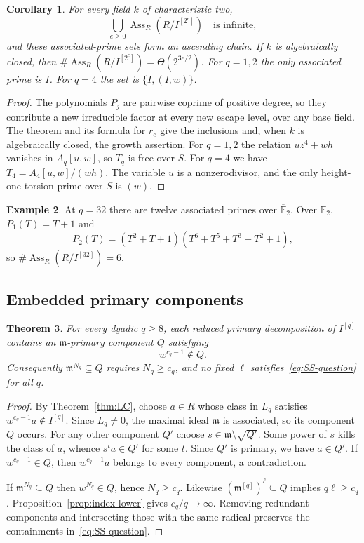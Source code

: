 \documentclass[11pt,a4paper,reqno]{amsart}
\numberwithin{equation}{section}
\theoremstyle{plain}
\newtheorem{theorem}{Theorem}[section]
\newtheorem{corollary}[theorem]{Corollary}
\theoremstyle{definition}
\newtheorem{example}[theorem]{Example}
\theoremstyle{remark}
\newcommand{\mm}{\mathfrak m}
\DeclareMathOperator{\Ass}{Ass}
\begin{document}
\begin{corollary}\label{cor:ass-growth}
For every field $k$ of characteristic two,
\[
\bigcup_{e\geq0}\Ass_R(R/I^{[2^e]})
\quad\text{is infinite},
\]
and these associated-prime sets form an ascending chain.
If $k$ is algebraically closed, then
$\#\Ass_R(R/I^{[2^e]})=\Theta(2^{3e/2})$.
For $q=1,2$ the only associated prime is $I$. For $q=4$ the set is
$\{I,(I,w)\}$.
\end{corollary}
\begin{proof}
The polynomials $P_j$ are pairwise coprime of positive degree,
so they contribute a new irreducible factor at every new escape
level, over any base field. The theorem and its formula for $r_e$
give the inclusions and, when $k$ is algebraically closed, the
growth assertion. For $q=1,2$ the relation $uz^4+wh$ vanishes in
$A_q[u,w]$, so $T_q$ is free over $S$. For $q=4$ we have
$T_4=A_4[u,w]/(wh)$. The variable $u$ is a nonzerodivisor,
and the only height-one torsion prime over $S$ is $(w)$.
\end{proof}

\begin{example}
At $q=32$ there are twelve associated primes over $\overline{\mathbb F}_2$. Over $\mathbb F_2$,
$P_1(T)=T+1$ and
\[
P_2(T)=(T^2+T+1)(T^6+T^5+T^3+T^2+1),
\]
so $\#\Ass_R(R/I^{[32]})=6$.
\end{example}

\subsection{Embedded primary components}
\begin{theorem}\label{thm:primary}
For every dyadic $q\geq8$, each reduced primary decomposition of
$I^{[q]}$ contains an $\mm$-primary component $Q$ satisfying
\[
 w^{c_q-1}\notin Q.
\]
Consequently $\mm^{N_q}\subseteq Q$ requires $N_q\geq c_q$, and
no fixed $\ell$ satisfies~\eqref{eq:SS-question} for all $q$.
\end{theorem}
\begin{proof}
By Theorem~\ref{thm:LC}, choose $a\in R$ whose class in $L_q$
satisfies $w^{c_q-1}a\notin I^{[q]}$. Since $L_q\ne0$, the maximal
ideal $\mm$ is associated, so its component $Q$ occurs.
For any other component $Q'$ choose $s\in\mm\setminus\sqrt{Q'}$.
Some power of $s$ kills the class of $a$, whence $s^ta\in Q'$
for some $t$. Since $Q'$ is primary, we have $a\in Q'$. If $w^{c_q-1}\in Q$,
then $w^{c_q-1}a$ belongs to every component, a contradiction.

If $\mm^{N_q}\subseteq Q$ then $w^{N_q}\in Q$, hence $N_q\geq c_q$.
Likewise $(\mm^{[q]})^\ell\subseteq Q$ implies $q\ell\geq c_q$.
Proposition~\ref{prop:index-lower} gives $c_q/q\to\infty$.
Removing redundant components and intersecting those with the same
radical preserves the containments in~\eqref{eq:SS-question}.
\end{proof}
\end{document}
